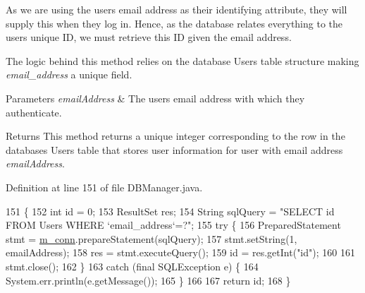 As we are using the user\textquotesingle{}s email address as their identifying attribute, they will supply this when they log in. Hence, as the database relates everything to the user\textquotesingle{}s unique ID, we must retrieve this ID given the email address.

The logic behind this method relies on the database Users table structure making {\itshape email\+\_\+address} a unique field.


\begin{DoxyParams}{Parameters}
{\em email\+Address} & The user\textquotesingle{}s email address with which they authenticate.\\
\hline
\end{DoxyParams}
\begin{DoxyReturn}{Returns}
This method returns a unique integer corresponding to the row in the database\textquotesingle{}s Users table that stores user information for user with email address {\itshape email\+Address}. 
\end{DoxyReturn}


Definition at line 151 of file D\+B\+Manager.\+java.


\begin{DoxyCode}
151                                                            \{
152         \textcolor{keywordtype}{int} \textcolor{keywordtype}{id} = 0;
153         ResultSet res;
154         String sqlQuery = \textcolor{stringliteral}{"SELECT id FROM Users WHERE `email\_address`=?"};
155         \textcolor{keywordflow}{try} \{
156             PreparedStatement stmt = \mbox{\hyperlink{classcom_1_1activitytracker_1_1_d_b_manager_a064088d13ac09eb147fdc19268771521}{m\_conn}}.prepareStatement(sqlQuery);
157             stmt.setString(1, emailAddress);
158             res =  stmt.executeQuery();
159             \textcolor{keywordtype}{id} = res.getInt(\textcolor{stringliteral}{"id"});
160 
161             stmt.close();
162         \}
163         \textcolor{keywordflow}{catch} (\textcolor{keyword}{final} SQLException e) \{
164             System.err.println(e.getMessage());
165         \}
166 
167         \textcolor{keywordflow}{return} id;
168     \}
\end{DoxyCode}
\mbox{\label{classcom_1_1activitytracker_1_1_d_b_manager_aab14c61b3f3a17bdea10cab1b5fd9337}} 
